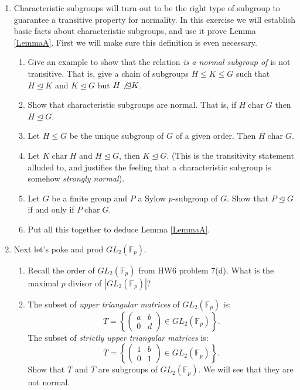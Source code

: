 \documentclass[11pt]{article}
\newcommand{\ch}{\operatorname{char}}
\newcommand{\bF}{\mathbb{F}}
\begin{document}
\begin{enumerate}
  \item{
  Characteristic subgroups will turn out to be the right type of subgroup to guarantee a transitive property for normality.  In this exercise we will establish basic facts about characteristic subgroups, and use it prove Lemma \ref{LemmaA}.  First we will make sure this definition is even necessary.
  \begin{enumerate}
    \item{
    Give an example to show that the relation \textit{is a normal subgroup of} is not transitive.  That is, give a chain of subgroups $H\le K\le G$ such that $H\unlhd K$ and $K\unlhd G$ but $H\not\unlhd K$.
    }
    \item{
    Show that characteristic subgroups are normal.  That is, if $H\ch G$ then $H\unlhd G$.
    }
    \item{
    Let $H\le G$ be the unique subgroup of $G$ of a given order.  Then $H\ch G$.
    }
    \item{
    Let $K\ch H$ and $H\unlhd G$, then $K\unlhd G$.  (This is the transitivity statement alluded to, and justifies the feeling that a characteristic subgroup is somehow \textit{strongly normal}).
    }
    \item{
    Let $G$ be a finite group and $P$ a Sylow $p$-subgroup of $G$.  Show that $P\unlhd G$ if and only if $P\ch G$.
    }
    \item{
    Put all this together to deduce Lemma \ref{LemmaA}.
    }
  \end{enumerate}
  }
  \item Next let's poke and prod $GL_2(\bF_p)$.
  \begin{enumerate}
    \item{
    Recall the order of $GL_2(\bF_p)$ from HW6 problem 7(d).  What is the maximal $p$ divisor of $|GL_2(\bF_p)|$?
    }
    \item{
    The subset of \textit{upper triangular matrices} of $GL_2(\bF_p)$ is:
    \[T = \left\{\begin{pmatrix}a & b\\0 & d\end{pmatrix}\in GL_2(\bF_p)\right\}.\]
    The subset of \textit{strictly upper triangular matrices} is:
    \[\overline T = \left\{\begin{pmatrix}1 & b\\0 & 1\end{pmatrix}\in GL_2(\bF_p)\right\}.\]
    Show that $T$ and $\overline T$ are subgroups of $GL_2(\bF_p)$.  We will see that they are not normal.
}
\end{enumerate}
\end{enumerate}
\end{document}

